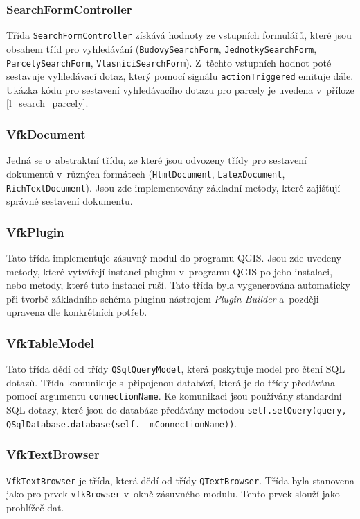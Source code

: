 \documentclass[a4paper,12pt,oneside]{book}
\begin{document}
\subsubsection{SearchFormController}
Třída \texttt{SearchFormController} získává hodnoty ze vstupních
formulářů, které jsou obsahem tříd pro vyhledávání
(\texttt{BudovySearchForm}, \texttt{JednotkySearchForm},
\texttt{Par\-celySearchForm}, \texttt{VlasniciSearchForm}). Z~těchto
vstupních hodnot poté sestavuje vyhledávací dotaz, který pomocí
signálu \texttt{actionTriggered} emituje dále. Ukázka kódu pro
sestavení vyhledávacího dotazu pro parcely je uvedena v~příloze
\ref{l_search_parcely}.

\subsubsection{VfkDocument}
\label{l_vfkDocument}
Jedná se o~abstraktní třídu, ze které jsou odvozeny třídy pro
sestavení dokumentů v~různých formátech (\texttt{HtmlDocument},
\texttt{LatexDocument}, \texttt{RichTextDocument}). Jsou zde
implementovány základní metody, které zajišťují správné sestavení
dokumentu.

\subsubsection{VfkPlugin}
Tato třída implementuje zásuvný modul do programu QGIS. Jsou zde
uvedeny metody, které vytvářejí instanci pluginu v~programu QGIS po
jeho instalaci, nebo metody, které tuto instanci ruší. Tato třída byla
vygenerována automaticky při tvorbě základního schéma pluginu
nástrojem \textit{Plugin Builder} a~později upravena dle konkrétních
potřeb.

\subsubsection{VfkTableModel}
Tato třída dědí od třídy \texttt{QSqlQueryModel}, která poskytuje
model pro čtení SQL dotazů. Třída komunikuje s~připojenou databází,
která je do třídy předávána pomocí argumentu
\texttt{connectionName}. Ke komunikaci jsou používány standardní SQL
dotazy, které jsou do databáze předávány metodou
\texttt{self.setQuery(query,
  QSqlDatabase.database(self.\_\_mConnectionName))}.

\subsubsection{VfkTextBrowser}
\texttt{VfkTextBrowser} je třída, která dědí od třídy
\texttt{QTextBrowser}. Třída byla stanovena jako  pro
prvek \texttt{vfkBrowser} v~okně zásuvného modulu. Tento prvek slouží
jako prohlížeč dat.
\end{document}
